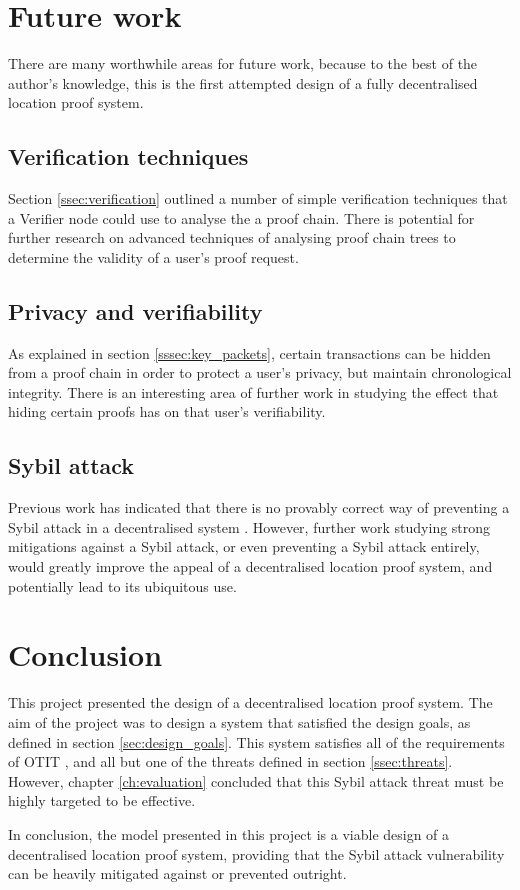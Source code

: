 \section{Future work}
There are many worthwhile areas for future work, because to the best of the author's knowledge, this is the first attempted design of a fully decentralised location proof system.

\subsection{Verification techniques}
Section \ref{ssec:verification} outlined a number of simple verification techniques that a Verifier node could use to analyse the a proof chain. There is potential for further research on advanced techniques of analysing proof chain trees to determine the validity of a user's proof request.

\subsection{Privacy and verifiability}
As explained in section \ref{sssec:key_packets}, certain transactions can be hidden from a proof chain in order to protect a user's privacy, but maintain chronological integrity. There is an interesting area of further work in studying the effect that hiding certain proofs has on that user's verifiability.

\subsection{Sybil attack}
Previous work has indicated that there is no provably correct way of preventing a Sybil attack in a decentralised system \cite{sybil}. However, further work studying strong mitigations against a Sybil attack, or even preventing a Sybil attack entirely, would greatly improve the appeal of a decentralised location proof system, and potentially lead to its ubiquitous use.

\section{Conclusion}
This project presented the design of a decentralised location proof system. The aim of the project was to design a system that satisfied the design goals, as defined in section \ref{sec:design_goals}. This system satisfies all of the requirements of OTIT \cite{otit}, and all but one of the threats defined in section \ref{ssec:threats}. However, chapter \ref{ch:evaluation} concluded that this Sybil attack threat must be highly targeted to be effective.

In conclusion, the model presented in this project is a viable design of a decentralised location proof system, providing that the Sybil attack vulnerability can be heavily mitigated against or prevented outright.